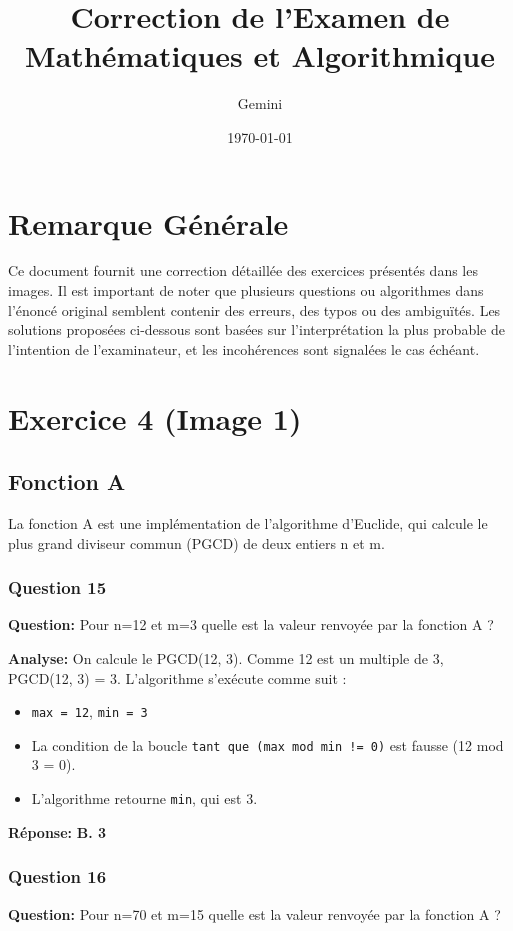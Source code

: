 \documentclass[12pt,a4paper]{article}
\title{Correction de l'Examen de Mathématiques et Algorithmique}
\author{Gemini}
\date{\today}
\begin{document}
\maketitle

\section*{Remarque Générale}
Ce document fournit une correction détaillée des exercices présentés dans les images. Il est important de noter que plusieurs questions ou algorithmes dans l'énoncé original semblent contenir des erreurs, des typos ou des ambiguïtés. Les solutions proposées ci-dessous sont basées sur l'interprétation la plus probable de l'intention de l'examinateur, et les incohérences sont signalées le cas échéant.

\newpage

\section{Exercice 4 (Image 1)}

\subsection{Fonction A}
La fonction A est une implémentation de l'algorithme d'Euclide, qui calcule le plus grand diviseur commun (PGCD) de deux entiers n et m.

\subsubsection{Question 15}
\textbf{Question:} Pour n=12 et m=3 quelle est la valeur renvoyée par la fonction A ?

\textbf{Analyse:} On calcule le PGCD(12, 3). Comme 12 est un multiple de 3, PGCD(12, 3) = 3.
L'algorithme s'exécute comme suit :
\begin{itemize}
    \item \texttt{max = 12}, \texttt{min = 3}
    \item La condition de la boucle \texttt{tant que (max mod min != 0)} est fausse (12 mod 3 = 0).
    \item L'algorithme retourne \texttt{min}, qui est 3.
\end{itemize}

\textbf{Réponse:} \textbf{B. 3}

\subsubsection{Question 16}
\textbf{Question:} Pour n=70 et m=15 quelle est la valeur renvoyée par la fonction A ?
\end{document}

